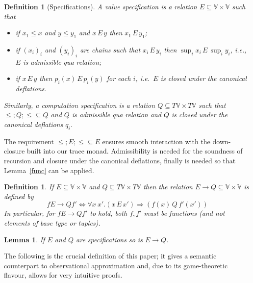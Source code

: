 \documentclass[nocopyrightspace,preprint]{sigplanconf}
\newtheorem{lemma}[theorem]{Lemma}
\newtheorem{definition}[theorem]{Definition}
\newcommand\E{\ensuremath{\,E\,}\xspace}
\newcommand{\Values}{\mathbb{V}}
\begin{document}
\begin{definition}[Specifications] A value 
specification is a relation $E\subseteq \Values \times\Values$ such that 
\begin{itemize}
\item if $x_1\leq x$ and $y\leq y_1$ and $x\E y$ then $x_1\E y_1$; 
\item if $(x_i)_i$ and $(y_i)_i$ are chains such that $x_i \E y_i$ then $\sup_i x_i \E \sup_i y_i$, i.e., $E$ is admissible qua relation; 
\item if $x\E y$ then $p_i(x)\E p_i(y)$ for each $i$, i.e.\ $E$ is closed under the canonical deflations. 
\end{itemize}
Similarly,  a computation specification is a 
relation $Q\subseteq T\Values\times T\Values$ such that 
${\leq};Q;{\leq}\subseteq Q$ and $Q$ is admissible qua relation and $Q$ is closed under the canonical deflations $q_i$. 
\end{definition}
The requirement ${\leq};E;{\leq}\subseteq E$ ensures smooth interaction with the down-closure built into our trace monad. Admissibility is needed for the soundness of recursion and closure under the canonical deflations, finally is needed so that Lemma~\ref{func} can be applied. 
\begin{definition}
If $E\subseteq \Values\times\Values$ and $Q\subseteq T\Values\times T\Values$
then 
the relation $E{\rightarrow}Q\subseteq \Values\times\Values$ is defined by 
\[
f E{\rightarrow}Q f' \iff \forall x\ x'.(x \E x') \Rightarrow (f(x)\,Q\, f'(x'))
\] 
In particular, for $f E{\rightarrow}Q f'$ to hold, both $f,f'$ must be functions (and not elements of base type or tuples). 
\end{definition}
\begin{lemma}
If $E$ and $Q$ are specifications so is $E{\rightarrow}Q$. 
\end{lemma}
The following is the crucial definition of this paper; it gives a semantic counterpart to observational approximation and, due to its game-theoretic flavour, allows for very intuitive proofs. 
\end{document}
